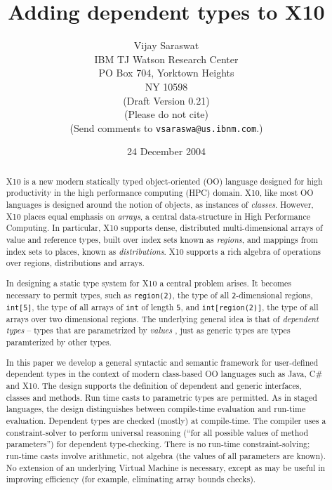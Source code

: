 \documentclass{article}
\def\csharp{{\sf C\#}}
\def\Xten{{\sf X10}}
\def\java{{\sf Java}}
\begin{document}
\title{Adding dependent types to X10}
\author{
Vijay Saraswat \\
IBM TJ Watson Research Center \\
PO Box 704, Yorktown Heights\\
NY 10598\\
({\sc Draft Version 0.21})\\
(Please do not cite)\\
(Send comments to {\tt vsaraswa@us.ibnm.com}.)
}

\date{24 December 2004}
\maketitle

\begin{abstract}
\Xten{} is a new modern statically typed object-oriented (OO) language
designed for high productivity in the high performance computing (HPC)
domain. \Xten{}, like most OO languages is designed around the notion
of objects, as instances of {\em classes}. However, \Xten{} places
equal emphasis on {\em arrays}, a central data-structure in High
Performance Computing. In particular, \Xten{} supports dense,
distributed multi-dimensional arrays of value and reference types,
built over index sets known as {\em regions}, and mappings from index
sets to places, known as {\em distributions}.  \Xten{} supports a rich
algebra of operations over regions, distributions and arrays.

In designing a static type system for \Xten{} a central problem
arises. It becomes necessary to permit types, such as {\tt region(2)},
the type of all {\tt 2}-dimensional regions, {\tt int[5]}, the type of
all arrays of {\tt int} of length {\tt 5}, and {\tt int[region(2)]},
the type of all arrays over two dimensional regions. The underlying
general idea is that of {\em dependent types} -- types that are
parametrized by {\em values} \cite{xi99dependent}, just as generic
types are types paramterized by other types.

In this paper we develop a general syntactic and semantic framework
for user-defined dependent types in the context of modern class-based
OO languages such as \java{}, \csharp{} and \Xten{}. The design
supports the definition of dependent and generic interfaces, classes
and methods.  Run time casts to parametric types are permitted.  As in
staged languages, the design distinguishes between compile-time
evaluation and run-time evaluation. Dependent types are checked
(mostly) at compile-time.  The compiler uses a constraint-solver to
perform universal reasoning (``for all possible values of method
parameters'') for dependent type-checking.  There is no run-time
constraint-solving; run-time casts involve arithmetic, not algebra
(the values of all parameters are known).  No extension of an
underlying Virtual Machine is necessary, except as may be useful in
improving efficiency (for example, eliminating array bounds checks).


\end{abstract}
\end{document}
